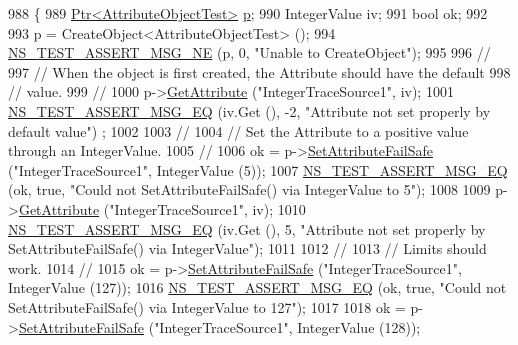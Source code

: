 \begin{DoxyCode}
988 \{
989   \hyperlink{classns3_1_1Ptr}{Ptr<AttributeObjectTest>} \hyperlink{lte__link__budget_8m_ac9de518908a968428863f829398a4e62}{p};
990   IntegerValue iv;
991   \textcolor{keywordtype}{bool} ok;
992 
993   p = CreateObject<AttributeObjectTest> ();
994   \hyperlink{group__testing_ga73d66fb0050a5111453fd144e767b91a}{NS\_TEST\_ASSERT\_MSG\_NE} (p, 0, \textcolor{stringliteral}{"Unable to CreateObject"});
995 
996   \textcolor{comment}{//}
997   \textcolor{comment}{// When the object is first created, the Attribute should have the default }
998   \textcolor{comment}{// value.}
999   \textcolor{comment}{//}
1000   p->\hyperlink{classns3_1_1ObjectBase_a895d1de2f96063d0e0fd78463e7a7e30}{GetAttribute} (\textcolor{stringliteral}{"IntegerTraceSource1"}, iv);
1001   \hyperlink{group__testing_ga2a9d78cffb3db8e867c35fff0b698cf5}{NS\_TEST\_ASSERT\_MSG\_EQ} (iv.Get (), -2, \textcolor{stringliteral}{"Attribute not set properly by default value"})
      ;
1002 
1003   \textcolor{comment}{//}
1004   \textcolor{comment}{// Set the Attribute to a positive value through an IntegerValue.}
1005   \textcolor{comment}{//}
1006   ok = p->\hyperlink{classns3_1_1ObjectBase_aa7d333004e970f925a4ed5df275541b5}{SetAttributeFailSafe} (\textcolor{stringliteral}{"IntegerTraceSource1"}, IntegerValue (5));
1007   \hyperlink{group__testing_ga2a9d78cffb3db8e867c35fff0b698cf5}{NS\_TEST\_ASSERT\_MSG\_EQ} (ok, \textcolor{keyword}{true}, \textcolor{stringliteral}{"Could not SetAttributeFailSafe() via IntegerValue
       to 5"});
1008 
1009   p->\hyperlink{classns3_1_1ObjectBase_a895d1de2f96063d0e0fd78463e7a7e30}{GetAttribute} (\textcolor{stringliteral}{"IntegerTraceSource1"}, iv);
1010   \hyperlink{group__testing_ga2a9d78cffb3db8e867c35fff0b698cf5}{NS\_TEST\_ASSERT\_MSG\_EQ} (iv.Get (), 5, \textcolor{stringliteral}{"Attribute not set properly by
       SetAttributeFailSafe() via IntegerValue"});
1011 
1012   \textcolor{comment}{//}
1013   \textcolor{comment}{// Limits should work.}
1014   \textcolor{comment}{//}
1015   ok = p->\hyperlink{classns3_1_1ObjectBase_aa7d333004e970f925a4ed5df275541b5}{SetAttributeFailSafe} (\textcolor{stringliteral}{"IntegerTraceSource1"}, IntegerValue (127));
1016   \hyperlink{group__testing_ga2a9d78cffb3db8e867c35fff0b698cf5}{NS\_TEST\_ASSERT\_MSG\_EQ} (ok, \textcolor{keyword}{true}, \textcolor{stringliteral}{"Could not SetAttributeFailSafe() via IntegerValue
       to 127"});
1017 
1018   ok = p->\hyperlink{classns3_1_1ObjectBase_aa7d333004e970f925a4ed5df275541b5}{SetAttributeFailSafe} (\textcolor{stringliteral}{"IntegerTraceSource1"}, IntegerValue (128));

\end{DoxyCode}
